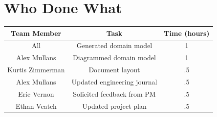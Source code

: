 \documentclass[12pt]{article}
\begin{document}
\section{Who Done What}
\begin{center}
\begin{tabular}{| c | c | c |}
            \hline

            \textbf{Team Member} &
            \textbf{Task} &
            \textbf{Time (hours)} \\ \hline

            All &
            Generated domain model &
            1 \\ \hline

            Alex Mullans &
            Diagrammed domain model &
            1 \\ \hline

            Kurtis Zimmerman &
            Document layout &
            .5 \\ \hline

            Alex Mullans &
            Updated engineering journal &
            .5 \\ \hline

            Eric Vernon &
            Solicited feedback from PM &
            .5 \\ \hline

            Ethan Veatch &
            Updated project plan &
            .5 \\ \hline

\end{tabular}
\end{center}
        
\end{document}
